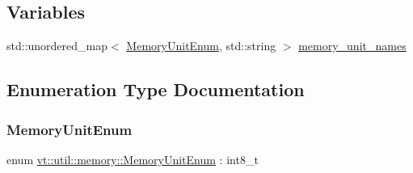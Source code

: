 \subsection*{Variables}
\begin{DoxyCompactItemize}
\item 
std\+::unordered\+\_\+map$<$ \hyperlink{namespacevt_1_1util_1_1memory_a64df3d84293b34009f78e2a1db2f9bb6}{Memory\+Unit\+Enum}, std\+::string $>$ \hyperlink{namespacevt_1_1util_1_1memory_aa772e07fd4860ed4086654c53eed51c2}{memory\+\_\+unit\+\_\+names}
\end{DoxyCompactItemize}


\subsection{Enumeration Type Documentation}
\mbox{\label{namespacevt_1_1util_1_1memory_a64df3d84293b34009f78e2a1db2f9bb6}} 
\subsubsection{\texorpdfstring{Memory\+Unit\+Enum}{MemoryUnitEnum}}
{\footnotesize\ttfamily enum \hyperlink{namespacevt_1_1util_1_1memory_a64df3d84293b34009f78e2a1db2f9bb6}{vt\+::util\+::memory\+::\+Memory\+Unit\+Enum} \+: int8\+\_\+t\hspace{0.3cm}{\ttfamily [strong]}}

